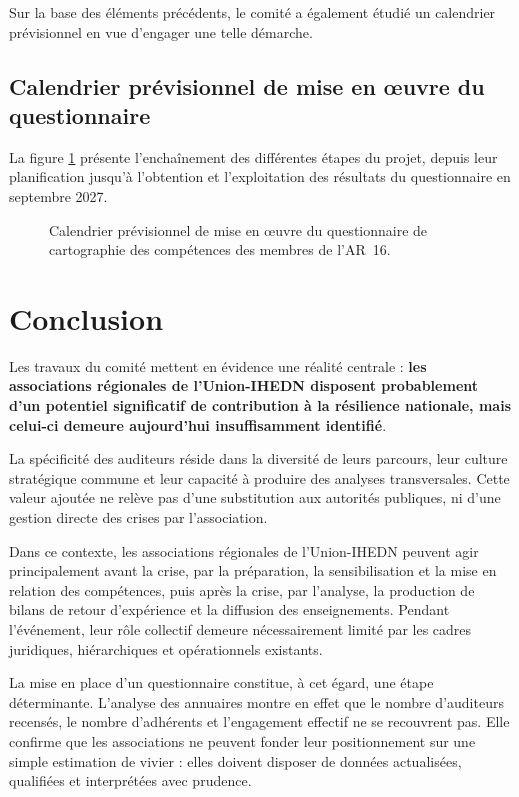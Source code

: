 \documentclass[12pt,a4paper]{article}
\newcommand{\UnionIHEDN}{Union-IHEDN}
\newcommand{\AssociationsRegionalesIHEDN}{associations régionales de l'\UnionIHEDN}
\newcommand{\ARSeize}{AR~16}
\begin{document}
Sur la base des éléments précédents, le comité a également étudié un calendrier prévisionnel en vue d'engager une telle démarche.

\clearpage

\subsection{Calendrier prévisionnel de mise en \oe{}uvre du questionnaire}

La figure \ref{fig:gantt-questionnaire-ar16} présente l'enchaînement des différentes étapes du projet, depuis leur planification jusqu'à l'obtention et l'exploitation des résultats du questionnaire en septembre 2027.

\begin{figure}[H]
\centering

\caption{Calendrier prévisionnel de mise en \oe{}uvre du questionnaire de cartographie des compétences des membres de l'\ARSeize.}
\label{fig:gantt-questionnaire-ar16}
\end{figure}
\clearpage

\section{Conclusion}

Les travaux du comité mettent en évidence une réalité centrale : \textbf{les \AssociationsRegionalesIHEDN{} disposent probablement d'un potentiel significatif de contribution à la résilience nationale, mais celui-ci demeure aujourd'hui insuffisamment identifié}.

La spécificité des auditeurs réside dans la diversité de leurs parcours, leur culture stratégique commune et leur capacité à produire des analyses transversales. Cette valeur ajoutée ne relève pas d'une substitution aux autorités publiques, ni d'une gestion directe des crises par l'association.

Dans ce contexte, les \AssociationsRegionalesIHEDN{} peuvent agir principalement avant la crise, par la préparation, la sensibilisation et la mise en relation des compétences, puis après la crise, par l'analyse, la production de bilans de retour d'expérience et la diffusion des enseignements. Pendant l'événement, leur rôle collectif demeure nécessairement limité par les cadres juridiques, hiérarchiques et opérationnels existants.

La mise en place d'un questionnaire constitue, à cet égard, une étape déterminante. L'analyse des annuaires montre en effet que le nombre d'auditeurs recensés, le nombre d'adhérents et l'engagement effectif ne se recouvrent pas. Elle confirme que les associations ne peuvent fonder leur positionnement sur une simple estimation de vivier : elles doivent disposer de données actualisées, qualifiées et interprétées avec prudence.
\end{document}
